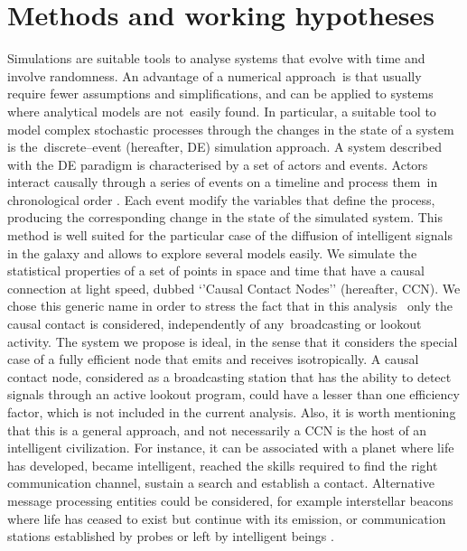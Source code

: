\documentclass[crop]{CSLB}
\newcommand{\ceti}{CCN}
\begin{document}
\section{Methods and working hypotheses}\label{S_methods}


Simulations are suitable tools to analyse systems that evolve with time and involve randomness.
%
An advantage of a numerical approach is that usually require fewer assumptions and simplifications, and can be applied to systems where analytical models are not easily found.
%
In particular, a suitable tool to model complex stochastic processes through the changes in the state of a system is the discrete--event (hereafter, DE) simulation approach.
%
A system described with the DE paradigm is characterised by a set of actors and events.
%
Actors interact causally through a series of events on a timeline and process them in chronological order \citep{ptolemaeus_system_2014, chung_simulation_2003, ross_simulation_2012}.
%
Each event modify the variables that define the process, producing the corresponding change in the state of the simulated system.
%
This method is well suited for the particular case of the diffusion of intelligent signals in the galaxy and allows to explore several models easily.
%
We simulate the statistical properties of a set of points in space and time that have a causal connection at light speed, dubbed ‘’Causal Contact Nodes’’ (hereafter, \ceti{}).
%
We chose this generic name in order to stress the fact that in this analysis 
only the causal contact is considered, independently of any broadcasting or lookout activity.
%
The system we propose is ideal, in the sense that it considers the special case of a fully efficient node that emits and receives isotropically.
%
A causal contact node, considered as a broadcasting station that has the ability to detect signals through an active lookout program, could have a lesser than one efficiency factor, which is not included in the current analysis.
%
Also, it is worth mentioning that this is a general approach, and not necessarily a \ceti{} is the host of an intelligent civilization.
%
For instance, it can be associated with a planet where life has developed, became intelligent, reached the skills required to find the right communication channel, sustain a search and establish a contact.
%
Alternative message processing entities could be considered, for example interstellar beacons where life has ceased to exist but continue with its emission, or communication stations established by probes or left by intelligent beings \citep[see, e.g., ][]{peters_outer_2018, barlow_galactic_2013}.
\end{document}
